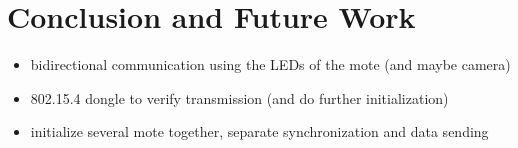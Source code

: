 \documentclass{sig-alternate} %
\begin{document}
\section{Conclusion and Future Work}
\label{sec:future_work}

\begin{itemize}
	\item bidirectional communication using the LEDs of the mote (and maybe camera)
	\item 802.15.4 dongle to verify transmission (and do further initialization)
	\item initialize several mote together, separate synchronization and data sending
\end{itemize}



\end{document}
